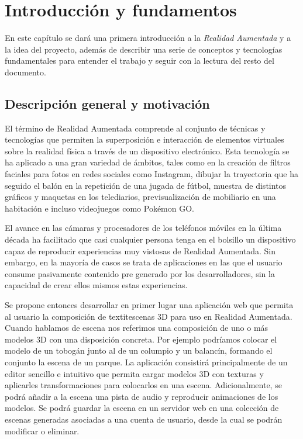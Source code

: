 \chapter{Introducción y fundamentos}


En este capítulo se dará una primera introducción a la \textit{Realidad Aumentada} y a la idea del proyecto, además de describir una serie de conceptos y tecnologías fundamentales para entender el trabajo y seguir con la lectura del resto del documento.


\section{Descripción general y motivación}

El término de Realidad Aumentada comprende al conjunto de técnicas y tecnologías que permiten la superposición e interacción de elementos virtuales sobre la realidad física a través de un dispositivo electrónico. Esta tecnología se ha aplicado a una gran variedad de ámbitos, tales como en la creación de filtros faciales para fotos en redes sociales como Instagram, dibujar la trayectoria que ha seguido el balón en la repetición de una jugada de fútbol, muestra de distintos gráficos y maquetas en los telediarios, previsualización de mobiliario en una habitación e incluso videojuegos como Pokémon GO.

El avance en las cámaras y procesadores de los teléfonos móviles en la última década ha facilitado que casi cualquier persona tenga en el bolsillo un dispositivo capaz de reproducir experiencias muy vistosas de Realidad Aumentada. Sin embargo, en la mayoría de casos se trata de aplicaciones en las que el usuario consume pasivamente contenido pre generado por los desarrolladores, sin la capacidad de crear ellos mismos estas experiencias.

Se propone entonces desarrollar en primer lugar una aplicación web que permita al usuario la composición de textit{escenas 3D} para uso en Realidad Aumentada. Cuando hablamos de escena nos referimos una composición de uno o más modelos 3D con una disposición concreta. Por ejemplo podríamos colocar el modelo de un tobogán junto al de un columpio y un balancín, formando el conjunto la escena de un parque. La aplicación consistirá principalmente de un editor sencillo e intuitivo que permita cargar modelos 3D con texturas y aplicarles transformaciones para colocarlos en una escena. Adicionalmente, se podrá añadir a la escena una pista de audio y reproducir animaciones de los modelos. Se podrá guardar la escena en un servidor web en una colección de escenas generadas asociadas a una cuenta de usuario, desde la cual se podrán modificar o eliminar.

